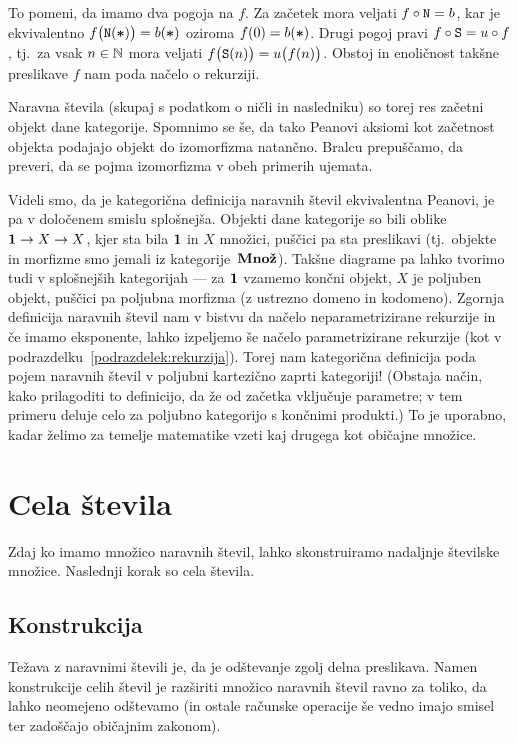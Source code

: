 
To pomeni, da imamo dva pogoja na $f$. Za začetek mora veljati $f \circ \mathtt{N} = b$, kar je ekvivalentno $f\big(\mathtt{N}(\mathord{\boldsymbol{*}})\big) = b(\mathord{\boldsymbol{*}})$ oziroma $f(0) = b(\mathord{\boldsymbol{*}})$. Drugi pogoj pravi $f \circ \mathtt{S} = u \circ f$, tj.~za vsak $n \in \mathbb{N}$ mora veljati $f\big(\mathtt{S}(n)\big) = u\big(f(n)\big)$. Obstoj in enoličnost takšne preslikave $f$ nam poda načelo o rekurziji.

Naravna števila (skupaj s podatkom o ničli in nasledniku) so torej res začetni objekt dane kategorije. Spomnimo se še, da tako Peanovi aksiomi kot začetnost objekta podajajo objekt do izomorfizma natančno. Bralcu prepuščamo, da preveri, da se pojma izomorfizma v obeh primerih ujemata.

Videli smo, da je kategorična definicija naravnih števil ekvivalentna Peanovi, je pa v določenem smislu splošnejša. Objekti dane kategorije so bili oblike $\mathtt{\mathbf{1}} \to X \to X$, kjer sta bila $\mathtt{\mathbf{1}}$ in $X$ množici, puščici pa sta preslikavi (tj.~objekte in morfizme smo jemali iz kategorije~$\mathbf{Mno\check{z}}$). Takšne diagrame pa lahko tvorimo tudi v splošnejših kategorijah --- za $\mathtt{\mathbf{1}}$ vzamemo končni objekt, $X$ je poljuben objekt, puščici pa poljubna morfizma (z ustrezno domeno in kodomeno). Zgornja definicija naravnih števil nam v bistvu da načelo neparametrizirane rekurzije in če imamo eksponente, lahko izpeljemo še načelo parametrizirane rekurzije (kot v podrazdelku~\ref{podrazdelek:rekurzija}). Torej nam kategorična definicija poda pojem naravnih števil v poljubni kartezično zaprti kategoriji! (Obstaja način, kako prilagoditi to definicijo, da že od začetka vključuje parametre; v tem primeru deluje celo za poljubno kategorijo s končnimi produkti.) To je uporabno, kadar želimo za temelje matematike vzeti kaj drugega kot običajne množice.


\section{Cela števila}

Zdaj ko imamo množico naravnih števil, lahko skonstruiramo nadaljnje številske množice. Naslednji korak so cela števila.

\subsection{Konstrukcija}

Težava z naravnimi števili je, da je odštevanje zgolj delna preslikava. Namen konstrukcije celih števil je razširiti množico naravnih števil ravno za toliko, da lahko neomejeno odštevamo (in ostale računske operacije še vedno imajo smisel ter zadoščajo običajnim zakonom).

